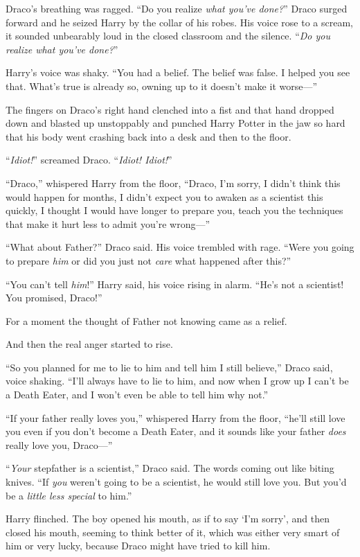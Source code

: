 Draco’s breathing was ragged. “Do you realize \emph{what you’ve done?}” Draco surged forward and he seized Harry by the collar of his robes. His voice rose to a scream, it sounded unbearably loud in the closed classroom and the silence. “\emph{Do you realize what you’ve done?}”

Harry’s voice was shaky. “You had a belief. The belief was false. I helped you see that. What’s true is already so, owning up to it doesn’t make it worse—”

The fingers on Draco’s right hand clenched into a fist and that hand dropped down and blasted up unstoppably and punched Harry Potter in the jaw so hard that his body went crashing back into a desk and then to the floor.

“\emph{Idiot!}” screamed Draco. “\emph{Idiot! Idiot!}”

“Draco,” whispered Harry from the floor, “Draco, I’m sorry, I didn’t think this would happen for months, I didn’t expect you to awaken as a scientist this quickly, I thought I would have longer to prepare you, teach you the techniques that make it hurt less to admit you’re wrong—”

“What about Father?” Draco said. His voice trembled with rage. “Were you going to prepare \emph{him} or did you just not \emph{care} what happened after this?”

“You can’t tell \emph{him}!” Harry said, his voice rising in alarm. “He’s not a scientist! You promised, Draco!”

For a moment the thought of Father not knowing came as a relief.

And then the real anger started to rise.

“So you planned for me to lie to him and tell him I still believe,” Draco said, voice shaking. “I’ll always have to lie to him, and now when I grow up I can’t be a Death Eater, and I won’t even be able to tell him why not.”

“If your father really loves you,” whispered Harry from the floor, “he’ll still love you even if you don’t become a Death Eater, and it sounds like your father \emph{does} really love you, Draco—”

“\emph{Your} stepfather is a scientist,” Draco said. The words coming out like biting knives. “If \emph{you} weren’t going to be a scientist, he would still love you. But you’d be a \emph{little less special} to him.”

Harry flinched. The boy opened his mouth, as if to say ‘I’m sorry’, and then closed his mouth, seeming to think better of it, which was either very smart of him or very lucky, because Draco might have tried to kill him.

